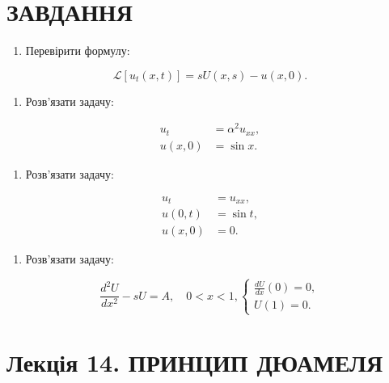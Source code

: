 \documentclass[
  ukrainian,
]{article}
\providecommand{\tightlist}{%
  \setlength{\itemsep}{0pt}\setlength{\parskip}{0pt}}
\begin{document}
\section{ЗАВДАННЯ}\label{ux437ux430ux432ux434ux430ux43dux43dux44f-9}

\begin{enumerate}
\def\labelenumi{\arabic{enumi}.}
\tightlist
\item
  Перевірити формулу:
\end{enumerate}

\[
\mathscr{L}[u_t(x,t)] = sU(x,s) - u(x,0).
\]

\begin{enumerate}
\def\labelenumi{\arabic{enumi}.}
\setcounter{enumi}{1}
\tightlist
\item
  Розв'язати задачу:
\end{enumerate}

\[
\begin{aligned}
u_t &= \alpha^2 u_{xx}, \\
u(x,0) &= \sin x.
\end{aligned}
\]

\begin{enumerate}
\def\labelenumi{\arabic{enumi}.}
\setcounter{enumi}{2}
\tightlist
\item
  Розв'язати задачу:
\end{enumerate}

\[
\begin{aligned}
u_t &= u_{xx}, \\
u(0,t) &= \sin t, \\
u(x,0) &= 0.
\end{aligned}
\]

\begin{enumerate}
\def\labelenumi{\arabic{enumi}.}
\setcounter{enumi}{3}
\tightlist
\item
  Розв'язати задачу:
\end{enumerate}

\[
\frac{d^2U}{dx^2} - sU = A, \quad 0 < x < 1,
\begin{cases}
\frac{dU}{dx}(0) = 0, \\
U(1) = 0.
\end{cases}
\]

\section{Лекція 14. ПРИНЦИП
ДЮАМЕЛЯ}\label{ux43bux435ux43aux446ux456ux44f-14.-ux43fux440ux438ux43dux446ux438ux43f-ux434ux44eux430ux43cux435ux43bux44f}
\end{document}
